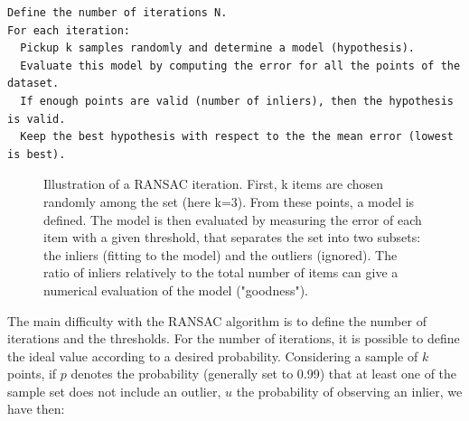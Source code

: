 \begin{verbatim}
Define the number of iterations N.
For each iteration:
  Pickup k samples randomly and determine a model (hypothesis).
  Evaluate this model by computing the error for all the points of the dataset.
  If enough points are valid (number of inliers), then the hypothesis is valid.
  Keep the best hypothesis with respect to the the mean error (lowest is best).
\end{verbatim}

\begin{figure}[H]
\centering%
\caption{Illustration of a RANSAC iteration. \protect{}First, k items are chosen randomly among the set (here k=3). \protect{}From these points, a model is defined. \protect{}The model is then evaluated by measuring the error of each item with a given threshold, that separates the set into two subsets: the inliers (fitting to the model) and the outliers (ignored). The ratio of inliers relatively to the total number of items can give a numerical evaluation of the model ("goodness").}
\end{figure}


The main difficulty with the \gls{RANSAC} algorithm is to define the number of iterations and the thresholds.
For the number of iterations, it is possible to define the ideal value according to a desired probability. Considering a sample of $k$ points, if $p$ denotes the probability (generally set to 0.99) that at least one of the sample set does not include an outlier, $u$ the probability of observing an inlier, we have then:

